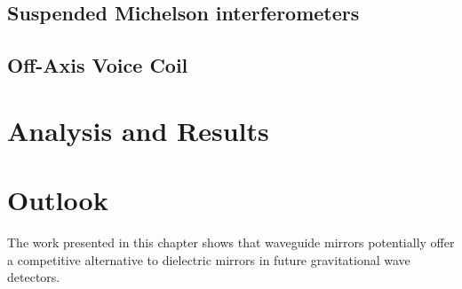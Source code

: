 \subsection{Suspended Michelson interferometers}

\subsection{Off-Axis Voice Coil}

\section{Analysis and Results}

\section{Outlook}

The work presented in this chapter shows that waveguide mirrors potentially offer a competitive alternative to dielectric mirrors in future gravitational wave detectors.

